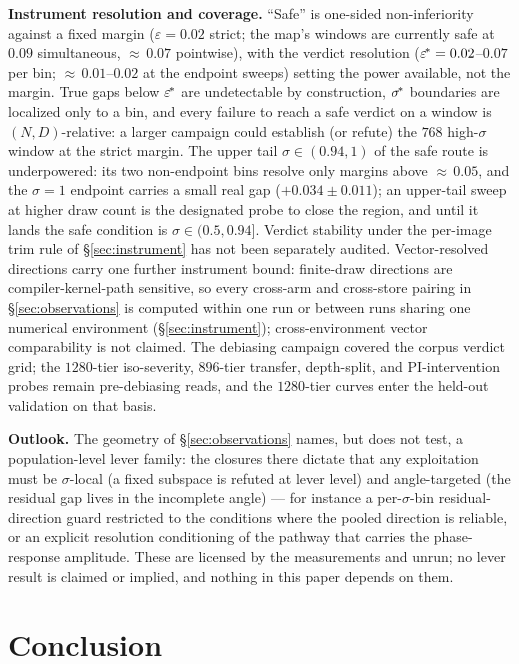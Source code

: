 \textbf{Instrument resolution and coverage.} ``Safe'' is one-sided
non-inferiority against a fixed margin ($\varepsilon = 0.02$ strict;
the map's windows are currently safe at $0.09$ simultaneous,
${\approx}\,0.07$ pointwise), with the
verdict resolution ($\varepsilon^{\!*} = 0.02$--$0.07$ per bin;
${\approx}\,0.01$--$0.02$ at the endpoint sweeps) setting the power
available, not the margin. True gaps below $\varepsilon^{\!*}$ are undetectable
by construction, $\sigma^{\!*}$ boundaries are localized only to a bin,
and every failure to reach a safe verdict on a window is $(N, D)$-relative: a
larger campaign could establish (or refute) the $768$ high-$\sigma$
window at the strict margin. The upper tail $\sigma \in (0.94, 1)$ of
the safe route is underpowered: its two non-endpoint bins resolve only
margins above ${\approx}\,0.05$, and the $\sigma{=}1$ endpoint
carries a small real gap ($+0.034 \pm 0.011$); an upper-tail sweep at
higher draw count is the designated probe to close the region, and
until it lands the safe condition is $\sigma \in (0.5, 0.94]$. Verdict stability under the per-image trim rule of
\S\ref{sec:instrument} has not been separately audited.
Vector-resolved directions carry one further instrument bound:
finite-draw directions are compiler-kernel-path sensitive, so every
cross-arm and cross-store pairing in \S\ref{sec:observations} is
computed within one run or between runs sharing one numerical
environment (\S\ref{sec:instrument}); cross-environment vector
comparability is not claimed. The
debiasing campaign covered the corpus verdict grid; the $1280$-tier
iso-severity, $896$-tier transfer, depth-split, and PI-intervention
probes remain pre-debiasing reads, and the $1280$-tier curves enter the
held-out validation on that basis.

\textbf{Outlook.} The geometry of \S\ref{sec:observations} names,
but does not test, a population-level lever family: the closures
there dictate that any exploitation must be $\sigma$-local (a fixed
subspace is refuted at lever level) and angle-targeted (the residual
gap lives in the incomplete angle) --- for instance a per-$\sigma$-bin
residual-direction guard restricted to the conditions where the
pooled direction is reliable, or an explicit resolution conditioning
of the pathway that carries the phase-response amplitude. These are
licensed by the measurements and unrun; no lever result is claimed
or implied, and nothing in this paper depends on them.

\section{Conclusion}
\label{sec:conclusion}


